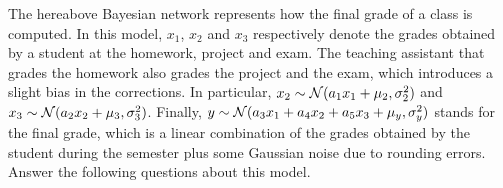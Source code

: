 \documentclass[11pt, a4paper]{article}
\begin{document}
\begin{figure}[h]
    \centering
\end{figure}

The hereabove Bayesian network represents how the final grade of a class is computed. In this model, $x_1$, $x_2$ and $x_3$ respectively denote the grades obtained by a student at the homework, project and exam. The teaching assistant that grades the homework also grades the project and the exam, which introduces a slight bias in the corrections. In particular, $x_2 \sim \mathcal{N}(a_1 x_1 + \mu_2, \sigma_2^2)$ and $x_3 \sim \mathcal{N}(a_2 x_2 + \mu_3, \sigma_3^2)$. Finally, $y \sim \mathcal{N}(a_3 x_1 + a_4 x_2 + a_5 x_3 + \mu_y, \sigma_y^2)$ stands for the final grade, which is a linear combination of the grades obtained by the student during the semester plus some Gaussian noise due to rounding errors. Answer the following questions about this model.
\end{document}
